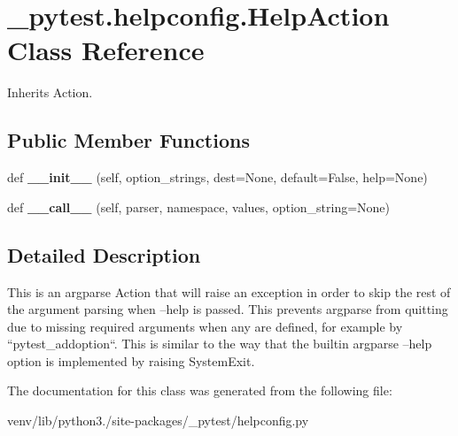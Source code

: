 \hypertarget{class__pytest_1_1helpconfig_1_1_help_action}{}\section{\+\_\+pytest.\+helpconfig.\+Help\+Action Class Reference}
\label{class__pytest_1_1helpconfig_1_1_help_action}


Inherits Action.

\subsection*{Public Member Functions}
\begin{DoxyCompactItemize}
\item 
\mbox{\label{class__pytest_1_1helpconfig_1_1_help_action_a212496189a3e0759999e6dda3166cb0c}} 
def {\bfseries \+\_\+\+\_\+init\+\_\+\+\_\+} (self, option\+\_\+strings, dest=None, default=False, help=None)
\item 
\mbox{\label{class__pytest_1_1helpconfig_1_1_help_action_ab8ff342284f473581a4ad7c6ad3ebcae}} 
def {\bfseries \+\_\+\+\_\+call\+\_\+\+\_\+} (self, parser, namespace, values, option\+\_\+string=None)
\end{DoxyCompactItemize}


\subsection{Detailed Description}
\begin{DoxyVerb}This is an argparse Action that will raise an exception in
order to skip the rest of the argument parsing when --help is passed.
This prevents argparse from quitting due to missing required arguments
when any are defined, for example by ``pytest_addoption``.
This is similar to the way that the builtin argparse --help option is
implemented by raising SystemExit.
\end{DoxyVerb}
 

The documentation for this class was generated from the following file\+:\begin{DoxyCompactItemize}
\item 
venv/lib/python3./site-\/packages/\+\_\+pytest/helpconfig.\+py\end{DoxyCompactItemize}
